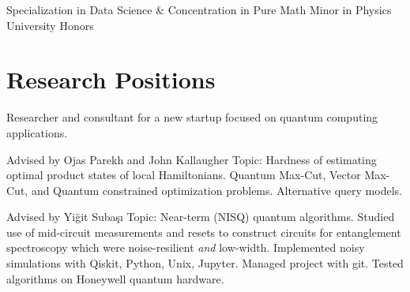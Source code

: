 \documentclass[11pt,letterpaper,serif]{moderncv}
\begin{document}
{}{}

\smallskip

\vspace{-\parsep}
{
	\begin{adjustwidth}{.25in}{}
		Specialization in Data Science \&
		Concentration in Pure Math \newline
		Minor in Physics \newline
		University Honors
	\end{adjustwidth}
}

%
\section{Research Positions}
{
	\begin{adjustwidth}{.25in}{}
		Researcher and consultant for a new startup focused on quantum computing applications.
	\end{adjustwidth}
}


{
	\begin{adjustwidth}{.25in}{}
		Advised by Ojas Parekh and John Kallaugher \newline
		Topic: Hardness of estimating optimal product states of local Hamiltonians. Quantum Max-Cut, Vector Max-Cut, and Quantum constrained optimization problems.
		Alternative query models.
	\end{adjustwidth}
}

{
	\begin{adjustwidth}{.25in}{}
		Advised by Yi\u{g}it Suba\c{s}\i \newline
		Topic: Near-term (NISQ) quantum algorithms. Studied use of mid-circuit measurements and resets to construct circuits for entanglement spectroscopy which were noise-resilient \textit{and} low-width. \newline
		Implemented noisy simulations with Qiskit, Python, Unix, Jupyter. Managed project with git. Tested algorithms on Honeywell quantum hardware.
	\end{adjustwidth}
}
\end{document}
